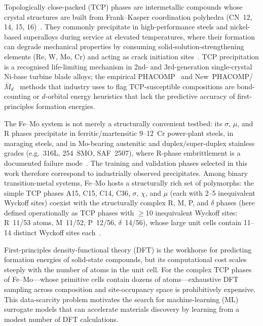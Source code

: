 
Topologically close-packed (TCP) phases are intermetallic compounds whose crystal structures are built from Frank--Kasper coordination polyhedra (CN~12, 14, 15, 16)~\cite{frank_kasper_1,frank_kasper_2,sinha_1972,hall_algie_1966}. They commonly precipitate in high-performance steels and nickel-based superalloys during service at elevated temperatures, where their formation can degrade mechanical properties by consuming solid-solution-strengthening elements (Re, W, Mo, Cr) and acting as crack initiation sites~\cite{smith_tcp,rae_reed_2001,reed_superalloys}. TCP precipitation is a recognised life-limiting mechanism in 2nd- and 3rd-generation single-crystal Ni-base turbine blade alloys; the empirical PHACOMP~\cite{woodyatt_1966} and New~PHACOMP/$\bar{M}_d$~\cite{morinaga_1984} methods that industry uses to flag TCP-susceptible compositions are bond-counting or $d$-orbital energy heuristics that lack the predictive accuracy of first-principles formation energies.

The Fe--Mo system is not merely a structurally convenient testbed: its $\sigma$, $\mu$, and R phases precipitate in ferritic/martensitic 9--12~Cr power-plant steels, in maraging steels, and in Mo-bearing austenitic and duplex/super-duplex stainless grades (e.g.\ 316L, 254~SMO, SAF~2507), where R-phase embrittlement is a documented failure mode~\cite{nilsson_1992,sieurin_2007,joubert_2008}. The training and validation phases selected in this work therefore correspond to industrially observed precipitates. Among binary transition-metal systems, Fe--Mo hosts a structurally rich set of polymorphs: the simple TCP phases A15, C15, C14, C36, $\sigma$, $\chi$, and $\mu$ (each with 2--5 inequivalent Wyckoff sites) coexist with the structurally complex R, M, P, and $\delta$ phases (here defined operationally as TCP phases with $\geq$10 inequivalent Wyckoff sites: R~11/53 atoms, M~11/52, P~12/56, $\delta$~14/56), whose large unit cells contain 11--14 distinct Wyckoff sites each~\cite{crivello_tcp, joubert_fe_mo}.

First-principles density-functional theory (DFT) is the workhorse for predicting formation energies of solid-state compounds, but its computational cost scales steeply with the number of atoms in the unit cell. For the complex TCP phases of Fe--Mo---whose primitive cells contain dozens of atoms---exhaustive DFT sampling across composition and site-occupancy space is prohibitively expensive. This data-scarcity problem motivates the search for machine-learning (ML) surrogate models that can accelerate materials discovery by learning from a modest number of DFT calculations.

